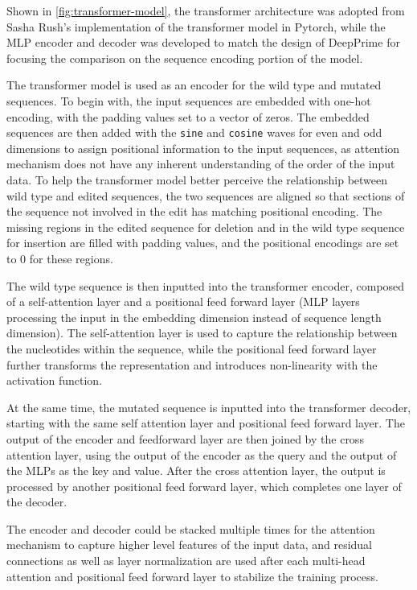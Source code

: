 Shown in \autoref{fig:transformer-model}, the transformer architecture was adopted from Sasha Rush's implementation of the transformer model in Pytorch\cite{AnnotatedTransformer}, while the MLP encoder and decoder was developed to match the design of DeepPrime for focusing the comparison on the sequence encoding portion of the model\cite{yuPredictionEfficienciesDiverse2023}.

The transformer model is used as an encoder for the wild type and mutated sequences. To begin with, the input sequences are embedded with one-hot encoding, with the padding values set to a vector of zeros.
The embedded sequences are then added with the \verb|sine| and \verb|cosine| waves for even and odd dimensions to assign positional information to the input sequences, as attention mechanism does not have any inherent understanding of the order of the input data. 
To help the transformer model better perceive the relationship between wild type and edited sequences, the two sequences are aligned so that sections of the sequence not involved in the edit has matching positional encoding. The missing regions in the edited sequence for deletion and in the wild type sequence for insertion are filled with padding values, and the positional encodings are set to 0 for these regions.

The wild type sequence is then inputted into the transformer encoder, composed of a self-attention layer and a positional feed forward layer (MLP layers processing the input in the embedding dimension instead of sequence length dimension). The self-attention layer is used to capture the relationship between the nucleotides within the sequence, while the positional feed forward layer further transforms the representation and introduces non-linearity with the activation function. 

At the same time, the mutated sequence is inputted into the transformer decoder, starting with the same self attention layer and positional feed forward layer. The output of the encoder and feedforward layer are then joined by the cross attention layer, using the output of the encoder as the query and the output of the MLPs as the key and value. After the cross attention layer, the output is processed by another positional feed forward layer, which completes one layer of the decoder. 

The encoder and decoder could be stacked multiple times for the attention mechanism to capture higher level features of the input data, and residual connections as well as layer normalization are used after each multi-head attention and positional feed forward layer to stabilize the training process.

